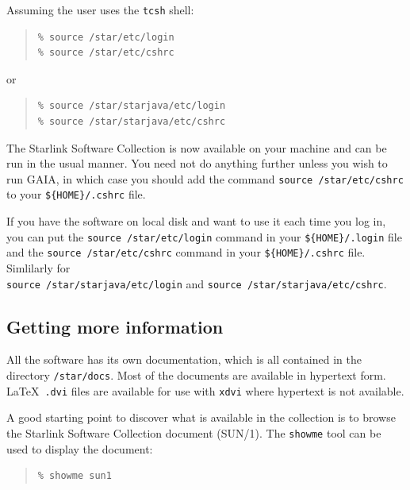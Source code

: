 \documentclass[twoside,11pt]{article}
\newcommand{\xref}[3]{#1}
\newcommand{\xlabel}[1]{}
\renewcommand{\_}{\texttt{\symbol{95}}}
\begin{document}
Assuming the user uses the \texttt{tcsh} shell:

\begin{quote}
\begin{verbatim}
% source /star/etc/login
% source /star/etc/cshrc
\end{verbatim}
\end{quote}

or

\begin{quote}
\begin{verbatim}
% source /star/starjava/etc/login
% source /star/starjava/etc/cshrc
\end{verbatim}
\end{quote}



The Starlink Software Collection is now available on your machine and
can be run in the usual manner.   You need not do anything further unless
you wish to run GAIA, in which case you should add the command
\texttt{source /star/etc/cshrc} to your \verb+${HOME}/.cshrc+ file.

If you have the software on local disk and want to use it each time you
log in, you can put the \texttt{source /star/etc/login} command in your
\verb+${HOME}/.login+ file and the \texttt{source /star/etc/cshrc}
command in your \verb+${HOME}/.cshrc+ file. Simlilarly for \\
\texttt{source /star/starjava/etc/login} and
\texttt{source /star/starjava/etc/cshrc}.

\subsection{\xlabel{getting_more_information}Getting more information}
\label{getting_more_information}

All the software has its own documentation, which is all contained in the
directory \texttt{/star/docs}.  Most of the documents are available in
hypertext form.  \LaTeX\ \texttt{.dvi} files are available for use with
\texttt{xdvi} where hypertext is not available.

A good starting point to discover what is available in the collection
is to browse the \xref{Starlink Software Collection}{sun1}{} document
(SUN/1).  The \texttt{showme} tool can be used to display the
document:

\begin{quote}
\begin{verbatim}
% showme sun1
\end{verbatim}
\end{quote}
\end{document}
